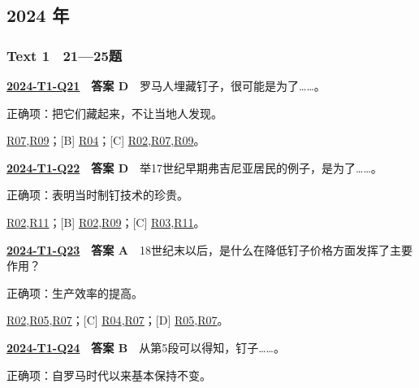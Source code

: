 \documentclass[11pt,a4paper]{article}
\begin{document}
\subsection{2024 年}\label{year-2024}
\subsubsection{Text 1　21—25题}
\label{idx-2024-T1-Q21}
\noindent\textbf{\href{https://zj139.github.io/math-notes/english/71d645546a599469a4b050c3/\#q21}{2024-T1-Q21}　答案 D}　罗马人埋藏钉子，很可能是为了……。\par\nopagebreak
\noindent 正确项：把它们藏起来，不让当地人发现。\par\nopagebreak
\noindent [A] \hyperref[cat-R07]{R07},\hyperref[cat-R09]{R09}；[B] \hyperref[cat-R04]{R04}；[C] \hyperref[cat-R02]{R02},\hyperref[cat-R07]{R07},\hyperref[cat-R09]{R09}。
\par\smallskip
{}\label{idx-2024-T1-Q22}
\noindent\textbf{\href{https://zj139.github.io/math-notes/english/71d645546a599469a4b050c3/\#q22}{2024-T1-Q22}　答案 D}　举17世纪早期弗吉尼亚居民的例子，是为了……。\par\nopagebreak
\noindent 正确项：表明当时制钉技术的珍贵。\par\nopagebreak
\noindent [A] \hyperref[cat-R02]{R02},\hyperref[cat-R11]{R11}；[B] \hyperref[cat-R02]{R02},\hyperref[cat-R09]{R09}；[C] \hyperref[cat-R03]{R03},\hyperref[cat-R11]{R11}。
\par\smallskip
{}\label{idx-2024-T1-Q23}
\noindent\textbf{\href{https://zj139.github.io/math-notes/english/71d645546a599469a4b050c3/\#q23}{2024-T1-Q23}　答案 A}　18世纪末以后，是什么在降低钉子价格方面发挥了主要作用？\par\nopagebreak
\noindent 正确项：生产效率的提高。\par\nopagebreak
\noindent [B] \hyperref[cat-R02]{R02},\hyperref[cat-R05]{R05},\hyperref[cat-R07]{R07}；[C] \hyperref[cat-R04]{R04},\hyperref[cat-R07]{R07}；[D] \hyperref[cat-R05]{R05},\hyperref[cat-R07]{R07}。
\par\smallskip
{}\label{idx-2024-T1-Q24}
\noindent\textbf{\href{https://zj139.github.io/math-notes/english/71d645546a599469a4b050c3/\#q24}{2024-T1-Q24}　答案 B}　从第5段可以得知，钉子……。\par\nopagebreak
\noindent 正确项：自罗马时代以来基本保持不变。\par\nopagebreak
\end{document}
